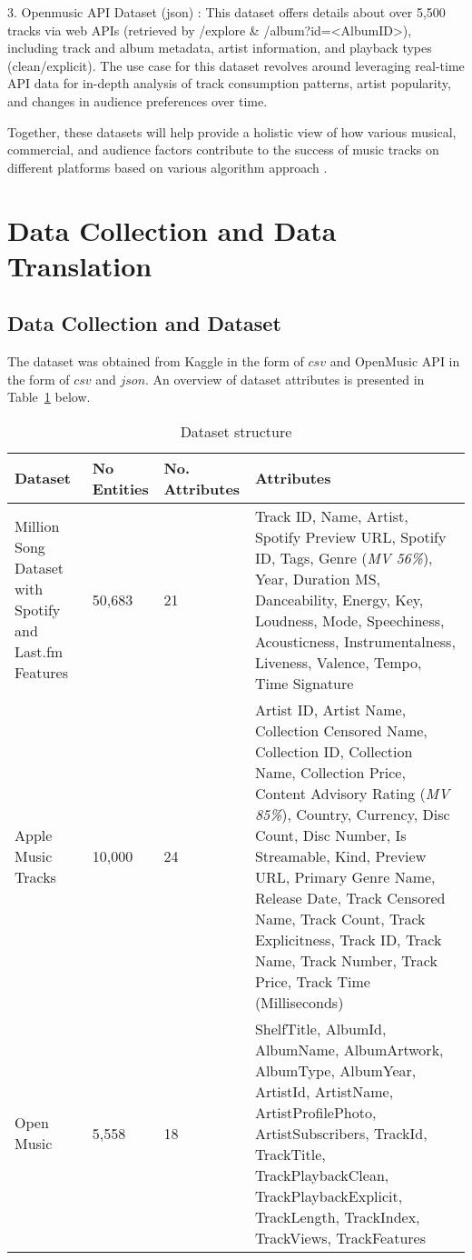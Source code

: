 \documentclass[runningheads]{llncs}
\begin{document}
3. Openmusic API Dataset (json) \cite{open_music}: This dataset offers details about over 5,500 tracks via web APIs (retrieved by /explore \& /album?id=<AlbumID>), including track and album metadata, artist information, and playback types (clean/explicit). The use case for this dataset revolves around leveraging real-time API data for in-depth analysis of track consumption patterns, artist popularity, and changes in audience preferences over time.

Together, these datasets will help provide a holistic view of how various musical, commercial, and audience factors contribute to the success of music tracks on different platforms based on various algorithm approach \cite{doan_principles_2012}.

\section{Data Collection and Data Translation}
\subsection{Data Collection and Dataset}
The dataset was obtained from Kaggle in the form of $csv$ and OpenMusic API in the form of $csv$ and $json$. An overview of dataset attributes is presented in Table~\ref{tab1} below.

\begin{table}[h]
	\renewcommand{\arraystretch}{1.5}
	\caption{Dataset structure}\label{tab1}
	\centering
	\begin{tabular}{p{3cm} p{3cm}p{3cm}p{5cm}}
		\toprule
		\textbf{Dataset} &  \textbf{ No Entities}&\textbf{No. Attributes}& \textbf{Attributes}\\
		\hline
		\hline
		Million Song Dataset with Spotify and Last.fm Features&50,683&21&Track ID, Name, Artist, Spotify Preview URL, Spotify ID, Tags, Genre (\emph{MV 56\%}), Year, Duration MS, Danceability, Energy, Key, Loudness, Mode, Speechiness, Acousticness, Instrumentalness, Liveness, Valence, Tempo, Time Signature\\
		Apple Music Tracks&10,000&24
		&Artist ID, Artist Name, Collection Censored Name, Collection ID, Collection Name, Collection Price, Content Advisory Rating (\emph{MV 85\%}), Country, Currency, Disc Count, Disc Number, Is Streamable, Kind, Preview URL, Primary Genre Name, Release Date, Track Censored Name, Track Count, Track Explicitness, Track ID, Track Name, Track Number, Track Price, Track Time (Milliseconds)\\
		Open Music&5,558&18&ShelfTitle, AlbumId, AlbumName, AlbumArtwork, AlbumType, AlbumYear, ArtistId, ArtistName, ArtistProfilePhoto, ArtistSubscribers, TrackId, TrackTitle, TrackPlaybackClean, TrackPlaybackExplicit, TrackLength, TrackIndex, TrackViews, TrackFeatures\\
		\hline
		\hline
	\end{tabular}
\end{table}
\end{document}
